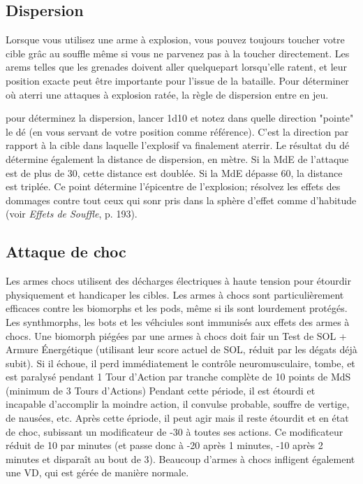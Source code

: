 \subsection{Dispersion} \label{sec:scatter} 

Lorsque vous utilisez une arme à explosion, vous pouvez toujours toucher votre cible grâc au souffle même si vous ne parvenez pas à la toucher directement. Les arems telles que les grenades doivent aller quelquepart lorsqu'elle ratent, et leur position exacte peut être importante pour l'issue de la bataille. Pour déterminer où aterri une attaques à explosion ratée, la règle de dispersion entre en jeu. 

pour déterminez la dispersion, lancer 1d10 et notez dans quelle direction "pointe" le dé (en vous servant de votre position comme référence). C'est la direction par rapport à la cible dans laquelle l'explosif va finalement aterrir. Le résultat du dé détermine également la distance de dispersion, en mètre. Si la MdE de l'attaque est de plus de 30, cette distance est doublée. Si la MdE dépasse 60, la distance est triplée. Ce point détermine l'épicentre de l'explosion; résolvez les effets des dommages contre tout ceux qui sonr pris dans la sphère d'effet comme d'habitude (voir \emph{Effets de Souffle}, p. 193). 

\subsection{Attaque de choc} \label{sec:shock-attacks} 

Les armes chocs utilisent des décharges électriques à haute tension pour étourdir physiquement et handicaper les cibles. Les armes à chocs sont particulièrement efficaces contre les biomorphs et les pods, même si ils sont lourdement protégés. Les synthmorphs, les bots et les véhciules sont immunisés aux effets des armes à chocs. Une biomorph piégées par une armes à chocs doit fair un Test de SOL + Armure Énergétique (utilisant leur score actuel de SOL, réduit par les dégats déjà subit). Si il échoue, il perd immédiatement le contrôle neuromusculaire, tombe, et est paralysé pendant 1 Tour d'Action par tranche complète de 10 points de MdS (minimum de 3 Tours d'Actions) Pendant cette période, il est étourdi et incapable d'accomplir la moindre action, il convulse probable, souffre de vertige, de nausées, etc. Après cette épriode, il peut agir mais il reste étourdit et en état de choc, subissant un modificateur de -30 à toutes ses actions. Ce modificateur réduit de 10 par minutes (et passe donc à -20 après 1 minutes, -10 après 2 minutes et disparaît au bout de 3). Beaucoup d'armes à chocs infligent également une VD, qui est gérée de manière normale. 

